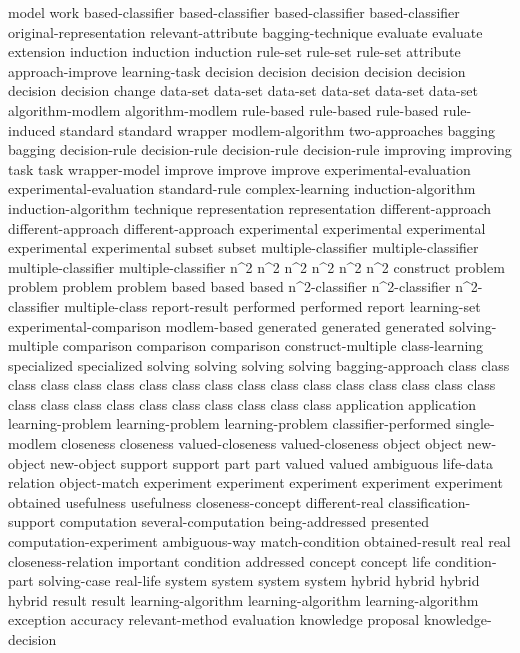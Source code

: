model	
work	
based-classifier	based-classifier	based-classifier	based-classifier	
original-representation	
relevant-attribute	
bagging-technique	
evaluate	evaluate	
extension	
induction	induction	induction	
rule-set	rule-set	rule-set	
attribute	
approach-improve	
learning-task	
decision	decision	decision	decision	decision	decision	decision	
change	
data-set	data-set	data-set	data-set	data-set	data-set	
algorithm-modlem	algorithm-modlem	
rule-based	rule-based	rule-based	
rule-induced	
standard	standard	
wrapper	
modlem-algorithm	
two-approaches	
bagging	bagging	
decision-rule	decision-rule	decision-rule	decision-rule	
improving	improving	
task	task	
wrapper-model	
improve	improve	improve	
experimental-evaluation	experimental-evaluation	
standard-rule	
complex-learning	
induction-algorithm	induction-algorithm	
technique	
representation	representation	
different-approach	different-approach	different-approach	
experimental	experimental	experimental	experimental	experimental	
subset	subset	
multiple-classifier	multiple-classifier	multiple-classifier	multiple-classifier	
n^2	n^2	n^2	n^2	n^2	n^2	
construct	
problem	problem	problem	problem	
based	based	based	
n^2-classifier	n^2-classifier	n^2-classifier	
multiple-class	
report-result	
performed	performed	
report	
learning-set	
experimental-comparison	
modlem-based	
generated	generated	generated	
solving-multiple	
comparison	comparison	comparison	
construct-multiple	
class-learning	
specialized	specialized	
solving	solving	solving	solving	
bagging-approach	
class	class	class	class	class	class	class	class	class	class	class	class	class	class	class	class	class	class	class	class	class	class	class	class	class	class	class	
application	application	
learning-problem	learning-problem	learning-problem	
classifier-performed	
single-modlem	
closeness	closeness	
valued-closeness	valued-closeness	
object	object	
new-object	new-object	
support	support	
part	part	
valued	valued	
ambiguous	
life-data	
relation	
object-match	
experiment	experiment	experiment	experiment	experiment	
obtained	
usefulness	usefulness	
closeness-concept	
different-real	
classification-support	
computation	
several-computation	
being-addressed	
presented	
computation-experiment	
ambiguous-way	
match-condition	
obtained-result	
real	real	
closeness-relation	
important	
condition	
addressed	
concept	concept	
life	
condition-part	
solving-case	
real-life	
system	system	system	system	
hybrid	hybrid	hybrid	hybrid	
result	result	
learning-algorithm	learning-algorithm	learning-algorithm	
exception	
accuracy	
relevant-method	
evaluation	
knowledge	
proposal	
knowledge-decision	
